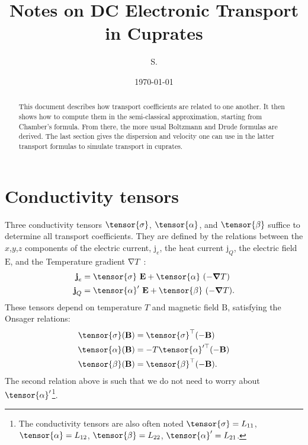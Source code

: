 \documentclass[notitlepage,11pt,nofootinbib]{revtex4-1}
\renewcommand{\vec}[1]{\bm{\mathrm{#1}}}
\begin{document}
\title{Notes on DC Electronic Transport in Cuprates}
\author{S. }
\date{\today}

\begin{abstract}
This document describes how transport coefficients are related to one another. It then shows how to compute them in the semi-classical approximation, starting from Chamber's formula. From there, the more usual Boltzmann and Drude formulas are derived. The last section gives the dispersion and velocity one can use in the latter transport formulas to simulate transport in cuprates.
\end{abstract}

\maketitle

\section{Conductivity tensors}
\noindent
Three conductivity tensors $\tensor{\sigma}$, $\tensor{\alpha}$, and $\tensor{\beta}$ suffice to determine all transport coefficients. They are defined by the relations between the $x$,$y$,$z$ components of the electric current, $\vec j_e$, the heat current $\vec j_Q$, the electric field $\vec E$, and the Temperature gradient $\vec \nabla T$~\cite{ashcroft_solid_1976,arsenault_transport_2013}:
\begin{align}
\vec j_e &= \tensor{\sigma}\ \vec E + \tensor{\alpha}\ (-\vec \nabla T)\\
\vec j_Q &= \tensor{\alpha}'\ \vec E + \tensor{\beta}\ (-\vec \nabla T).
\end{align}
These tensors depend on temperature $T$ and magnetic field $\vec B$, satisfying the Onsager relations:
\begin{align}
\tensor{\sigma}(\vec B) &= \tensor{\sigma}^{\top}(-\vec B)\\
\tensor{\alpha}(\vec B) &= -T\tensor{\alpha}'^{\top}(-\vec B)\\
\tensor{\beta}(\vec B) &= \tensor{\beta}^{\top}(-\vec B).
\end{align}
The second relation above is such that we do not need to worry about $\tensor{\alpha}'$\footnote{The conductivity tensors are also often noted $\tensor{\sigma}=L_{11}$, $\tensor{\alpha}=L_{12}$, $\tensor{\beta}=L_{22}$, $\tensor{\alpha}'=L_{21}$.}.
\end{document}
